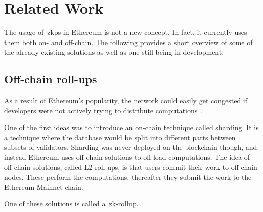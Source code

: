 
\section{Related Work}\label{sec:related-work}
The usage of~\glspl{zkp} in Ethereum is not a new concept.
In fact, it currently uses them both on- and off-chain.
The following provides a short overview of some of the already existing solutions as well as one still being in development.

\subsection{Off-chain roll-ups}\label{subsec:off-chain-roll-ups}
As a result of Ethereum's popularity, the network could easily get congested if developers were not actively trying to distribute computations~\cite{EthereumScaling2024}.

One of the first ideas was to introduce an on-chain technique called sharding.
It is a technique where the database would be split into different parts between subsets of validators.
Sharding was never deployed on the blockchain though, and instead Ethereum uses off-chain solutions to off-load computations.
The idea of off-chain solutions, called L2-roll-ups, is that users commit their work to off-chain nodes.
These perform the computations, thereafter they submit the work to the Ethereum Mainnet chain.

One of these solutions is called a~\gls{zk-rollup}.

